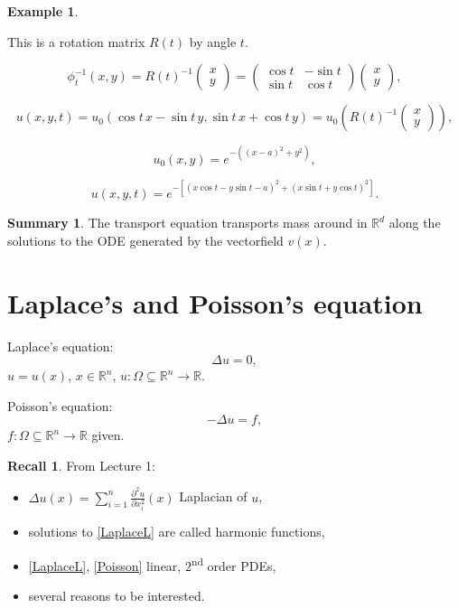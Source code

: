 \documentclass[12pt]{article}
\theoremstyle{definition}
\newtheorem*{recall}{Recall}
\newtheorem*{summary}{Summary}
\newtheorem*{example*}{Example}
\begin{document}
\begin{example*}
\begin{enumerate}[label=\arabic*)]
This is a rotation matrix $R(t)$ by angle $t$.

\[\phi_t^{-1}(x,y)=R(t)^{-1}\left(\begin{matrix}x\\y\end{matrix}\right)=\left(\begin{matrix}\cos t&-\sin t\\\sin t&\cos t\end{matrix}\right)\left(\begin{matrix}x\\y\end{matrix}\right),\]

\[u(x,y,t)=u_0(\cos t\,x-\sin t\,y,\sin t\,x+\cos t\,y)=u_0\left(R(t)^{-1}\left(\begin{matrix}x\\y\end{matrix}\right)\right),\]

\[u_0(x,y)=e^{-((x-a)^2+y^2)},\]

\[u(x,y,t)=e^{-[(x\cos t-y\sin t-a)^2+(x\sin t+y\cos t)^2]}.\]
\end{enumerate}
\end{example*}

\begin{summary}
The transport equation transports mass around in $\mathbb{R}^d$ along the solutions to the ODE generated by the vectorfield $v(x)$.
\end{summary}

\renewcommand{\theHsection}{section.\thesection}
\section{Laplace's and Poisson's equation}\label{Laplace_Poisson}
Laplace's equation:
\begin{equation}\tag{L}\label{LaplaceL}
\Delta u=0,
\end{equation}
$u=u(x)$, $x\in\mathbb{R}^n$, $u:\Omega\subseteq\mathbb{R}^n\rightarrow\mathbb{R}$.

Poisson's equation:
\begin{equation}\tag{P}\label{Poisson}
-\Delta u=f,
\end{equation}
$f:\Omega\subseteq\mathbb{R}^n\rightarrow\mathbb{R}$ given.

\begin{recall}
From Lecture 1:
\begin{itemize}
\item $\displaystyle{\Delta u(x)=\sum_{i=1}^n\frac{\partial^2u}{\partial x_i^2}(x)}$ Laplacian of $u$,
\item solutions to \eqref{LaplaceL} are called harmonic functions,
\item \eqref{LaplaceL}, \eqref{Poisson} linear, $2$\textsuperscript{nd} order PDEs,
\item several reasons to be interested.
\end{itemize}
\end{recall}
\end{document}

